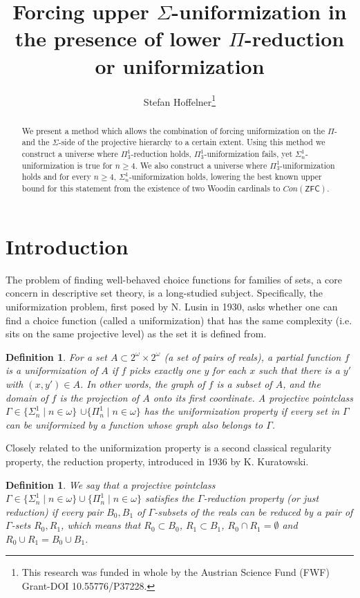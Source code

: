 \documentclass[a4paper,11pt]{article}
\title{Forcing upper $\Sigma$-uniformization in the presence of lower $\Pi$-reduction or uniformization}
\author{ Stefan Hoffelner\footnote{This research was funded in whole by the Austrian Science Fund (FWF) Grant-DOI 10.55776/P37228.}  }
\newtheorem{definition}[theorem]{Definition}
\newcommand{\ZFC}{\mathsf{ZFC}}
\begin{document}
    
    \maketitle
    
    
 \begin{abstract}
 We present a method which allows the combination of forcing uniformization on the $\Pi$- and the $\Sigma$-side of the projective hierarchy to a certain extent. Using this method
we construct a universe where ${\Pi}^1_3$-reduction holds, $\Pi^1_3$-uniformization fails, yet $\Sigma^1_n$-uniformization is true for $n \ge 4$. We also construct a universe where $\Pi^1_3$-uniformization holds and for every $n \ge 4$, $\Sigma^1_n$-uniformization holds, lowering the best known upper bound for this statement from the existence of two Woodin cardinals to $Con(\ZFC)$.
\end{abstract}


\section{Introduction}


The problem of finding well-behaved choice functions for families of sets, a core concern in descriptive set theory, is a long-studied subject. Specifically, the uniformization problem, first posed by N. Lusin in 1930, asks whether one can find a choice function (called a uniformization) that has the same complexity (i.e. sits on the same projective level) as the set it is defined from.


\begin{definition}
For a set $A \subset 2^{\omega} \times 2^{\omega}$ (a set of pairs of reals), a partial function $f$ is a uniformization of $A$ if $f$ picks exactly one $y$ for each $x$ such that there is a $y'$ with $(x, y') \in A$. In other words, the graph of $f$ is a subset of $A$, and the domain of $f$ is the projection of $A$ onto its first coordinate. A projective pointclass $\Gamma \in \{ \Sigma^1_n \mid n \in \omega\}$ $ \cup \{\Pi^1_n \mid n \in \omega \}$  has the uniformization property if every set in $\Gamma$ can be uniformized by a function whose graph also belongs to $\Gamma$.
\end{definition}


Closely related to the uniformization property is a second classical regularity property, the reduction property, introduced in 1936 by K. Kuratowski.


\begin{definition}
We say that a projective pointclass $\Gamma \in \{ \Sigma^1_n \mid n \in \omega\} \cup \{\Pi^1_n \mid n \in \omega \}$ satisfies the $\Gamma$-reduction property (or just reduction) if every pair $B_0,B_1$ of $\Gamma$-subsets of the reals can be reduced by a pair of $\Gamma$-sets $R_0,R_1$, which means that $R_0 \subset B_0$, $R_1 \subset B_1$, $R_0 \cap R_1= \emptyset$ and $R_0 \cup R_1=B_0 \cup B_1$.
\end{definition}
\end{document}
